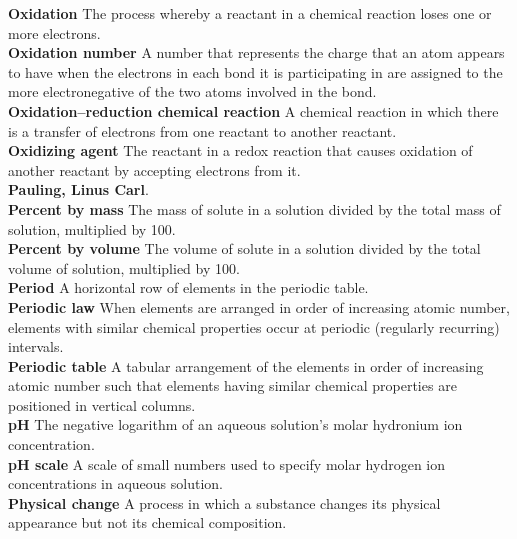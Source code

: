 \documentclass[10pt, roman]{article}
\begin{document}
\begin{minipage}[c]{0.30\textwidth}
\textbf{Oxidation} The process whereby a reactant in a chemical reaction loses one or more electrons. \\
\textbf{Oxidation number} A number that represents the charge that an atom appears to have when the electrons in each bond it is participating in are assigned to the more electronegative of the two atoms involved in the bond. \\
\textbf{Oxidation–reduction chemical reaction} A chemical reaction in which there is a transfer of electrons from one reactant to another reactant. \\
\textbf{Oxidizing agent} The reactant in a redox reaction that causes oxidation of another reactant by accepting electrons from it. \\
\textbf{Pauling, Linus Carl}. \\
\textbf{Percent by mass} The mass of solute in a solution divided by the total mass of solution, multiplied by 100. \\
\textbf{Percent by volume} The volume of solute in a solution divided by the total volume of solution, multiplied by 100. \\
\textbf{Period} A horizontal row of elements in the periodic table. \\
\textbf{Periodic law} When elements are arranged in order of increasing atomic number, elements with similar chemical properties occur at periodic (regularly recurring) intervals. \\
\textbf{Periodic table} A tabular arrangement of the elements in order of increasing atomic number such that elements having similar chemical properties are positioned in vertical columns. \\
\textbf{pH} The negative logarithm of an aqueous solution’s molar hydronium ion concentration. \\
\textbf{pH scale} A scale of small numbers used to specify molar hydrogen ion concentrations in aqueous solution. \\
\textbf{Physical change} A process in which a substance changes its physical appearance but not its chemical composition. \\
\end{minipage}%
\newpage
\end{document}
